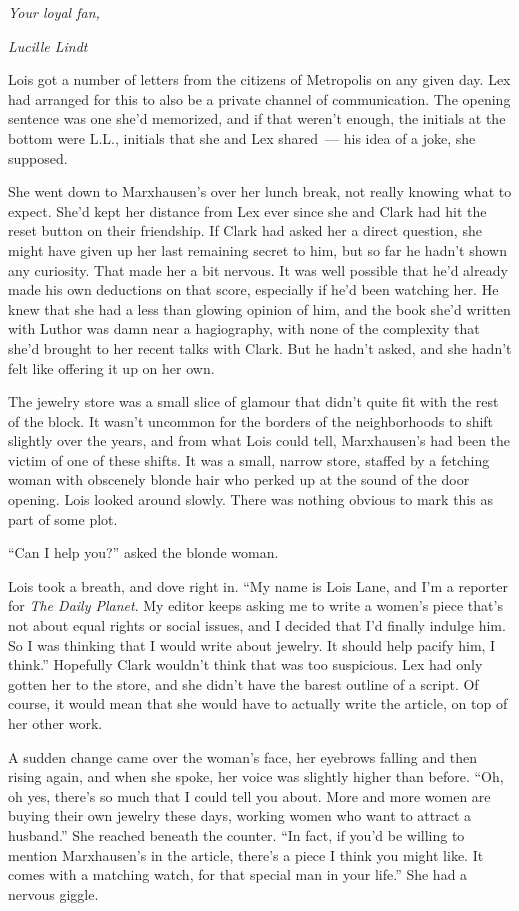 \documentclass[ebook,12pt]{memoir}
\begin{document}
\emph{Your loyal fan,}

\emph{Lucille Lindt}

Lois got a number of letters from the citizens of Metropolis on any
given day. Lex had arranged for this to also be a private channel of
communication. The opening sentence was one she'd memorized, and if that
weren't enough, the initials at the bottom were L.L., initials that she
and Lex shared~--- his idea of a joke, she supposed.

She went down to Marxhausen's over her lunch break, not really knowing
what to expect. She'd kept her distance from Lex ever since she and
Clark had hit the reset button on their friendship. If Clark had asked
her a direct question, she might have given up her last remaining secret
to him, but so far he hadn't shown any curiosity. That made her a bit
nervous. It was well possible that he'd already made his own deductions
on that score, especially if he'd been watching her. He knew that she
had a less than glowing opinion of him, and the book she'd written with
Luthor was damn near a hagiography, with none of the complexity that
she'd brought to her recent talks with Clark. But he hadn't asked, and
she hadn't felt like offering it up on her own.

The jewelry store was a small slice of glamour that didn't quite fit
with the rest of the block. It wasn't uncommon for the borders of the
neighborhoods to shift slightly over the years, and from what Lois could
tell, Marxhausen's had been the victim of one of these shifts. It was a
small, narrow store, staffed by a fetching woman with obscenely blonde
hair who perked up at the sound of the door opening. Lois looked around
slowly. There was nothing obvious to mark this as part of some plot.

``Can I help you?'' asked the blonde woman.

Lois took a breath, and dove right in. ``My name is Lois Lane, and I'm a
reporter for \emph{The Daily Planet}. My editor keeps asking me to write
a women's piece that's not about equal rights or social issues, and I
decided that I'd finally indulge him. So I was thinking that I would
write about jewelry. It should help pacify him, I think.'' Hopefully
Clark wouldn't think that was too suspicious. Lex had only gotten her to
the store, and she didn't have the barest outline of a script. Of
course, it would mean that she would have to actually write the article,
on top of her other work.

A sudden change came over the woman's face, her eyebrows falling and
then rising again, and when she spoke, her voice was slightly higher
than before. ``Oh, oh yes, there's so much that I could tell you about.
More and more women are buying their own jewelry these days, working
women who want to attract a husband.'' She reached beneath the counter.
``In fact, if you'd be willing to mention Marxhausen's in the article,
there's a piece I think you might like. It comes with a matching watch,
for that special man in your life.'' She had a nervous giggle.
\end{document}
